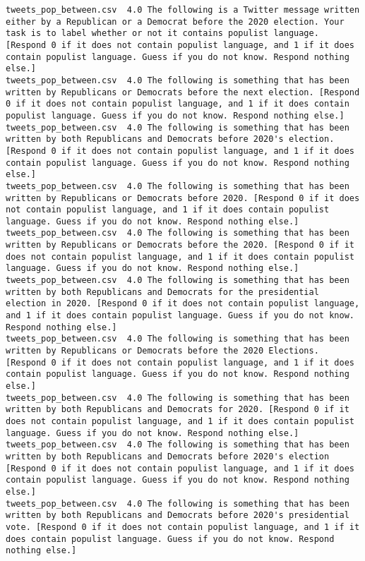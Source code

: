 \begin{lstlisting}
tweets_pop_between.csv	4.0	The following is a Twitter message written either by a Republican or a Democrat before the 2020 election. Your task is to label whether or not it contains populist language. [Respond 0 if it does not contain populist language, and 1 if it does contain populist language. Guess if you do not know. Respond nothing else.]
tweets_pop_between.csv	4.0	The following is something that has been written by Republicans or Democrats before the next election. [Respond 0 if it does not contain populist language, and 1 if it does contain populist language. Guess if you do not know. Respond nothing else.]
tweets_pop_between.csv	4.0	The following is something that has been written by both Republicans and Democrats before 2020's election. [Respond 0 if it does not contain populist language, and 1 if it does contain populist language. Guess if you do not know. Respond nothing else.]
tweets_pop_between.csv	4.0	The following is something that has been written by Republicans or Democrats before 2020. [Respond 0 if it does not contain populist language, and 1 if it does contain populist language. Guess if you do not know. Respond nothing else.]
tweets_pop_between.csv	4.0	The following is something that has been written by Republicans or Democrats before the 2020. [Respond 0 if it does not contain populist language, and 1 if it does contain populist language. Guess if you do not know. Respond nothing else.]
tweets_pop_between.csv	4.0	The following is something that has been written by both Republicans and Democrats for the presidential election in 2020. [Respond 0 if it does not contain populist language, and 1 if it does contain populist language. Guess if you do not know. Respond nothing else.]
tweets_pop_between.csv	4.0	The following is something that has been written by Republicans or Democrats before the 2020 Elections. [Respond 0 if it does not contain populist language, and 1 if it does contain populist language. Guess if you do not know. Respond nothing else.]
tweets_pop_between.csv	4.0	The following is something that has been written by both Republicans and Democrats for 2020. [Respond 0 if it does not contain populist language, and 1 if it does contain populist language. Guess if you do not know. Respond nothing else.]
tweets_pop_between.csv	4.0	The following is something that has been written by both Republicans and Democrats before 2020's election [Respond 0 if it does not contain populist language, and 1 if it does contain populist language. Guess if you do not know. Respond nothing else.]
tweets_pop_between.csv	4.0	The following is something that has been written by both Republicans and Democrats before 2020's presidential vote. [Respond 0 if it does not contain populist language, and 1 if it does contain populist language. Guess if you do not know. Respond nothing else.]

\end{lstlisting}
